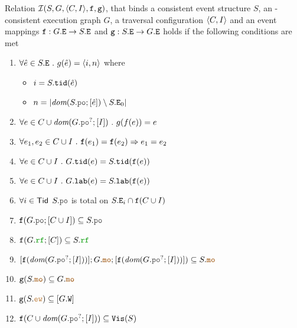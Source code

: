 \documentclass[12pt]{article}
\begin{document}
\begin{definition}
  Relation $\mathcal{I}(S, G, \langle C, I \rangle, {\mathtt{f}}, {\mathtt{g}})$, that binds a 
  consistent event structure $S$, an \imm-consistent execution graph $G$,
  a traversal configuration $\langle C, I \rangle$
  and an event mappings ${\mathtt{f}} : G.{\mathtt{E}} \rightarrow S.{\mathtt{E}}$ and ${\mathtt{g}} : S.{\mathtt{E}} \rightarrow G.{\mathtt{E}}$
  holds if the following conditions are met
  \begin{enumerate}[label={$\boldsymbol{\simR_{\arabic*}}$.},align=left]

    \item \label{item:sim-g-def}
    $\forall{\hat{e} \in S.{\mathtt{E}}} ~.~ g(\hat{e}) = \langle i, n \rangle$
    where 
    \begin{itemize}
      \item $i = S.{\mathtt{tid}}(\hat{e})$
      \item $n = |\dom{S.\lPO;[\hat{e}]} \setminus S.\lEo|$
    \end{itemize}
    
    \item \label{item:sim-fg-id}
    $\forall{e \in C \cup \dom{G.\lPO^?;[I]}} ~.~ g(f(e)) = e$

    \item \label{item:sim-finj}
    $\forall{e_1, e_2 \in C \cup I} ~.~ {\mathtt{f}}(e_1) = {\mathtt{f}}(e_2) \Rightarrow e_1 = e_2$

    \item \label{item:sim-ftid}
    $\forall{e \in C \cup I} ~.~ G.{\mathtt{tid}}(e) = S.{\mathtt{tid}}({\mathtt{f}}(e))$

    \item \label{item:sim-flab}
    $\forall{e \in C \cup I} ~.~ G.{\mathtt{lab}}(e) = S.{\mathtt{lab}}({\mathtt{f}}(e))$

    \item \label{item:sim-po-tot}
    $\forall{i \in \mathsf{Tid}}$
    $S.\lPO$ is total on $S.{\mathtt{E}}_{i} \cap {\mathtt{f}}(C \cup I)$

    \item \label{item:sim-po-in}
    $\f(G.\lPO;[C \cup I]) \subseteq S.\lPO$
    
    \item \label{item:sim-rf-in}
    $\f(G.\lRF;[C]) \subseteq S.\lRF$

    \item \label{item:sim-mo-in}
    $[\f(\dom{G.\lPO^?;[I]})];G.\lMO;[\f(\dom{G.\lPO^?;[I]})]) \subseteq S.\lMO$

    \item \label{item:sim-mo-pre}
    $\g(S.\lMO) \subseteq G.\lMO$

    \item \label{item:sim-ew-id}
    $\g(S.\lEW) \subseteq [G.\lW]$

    \item \label{item:sim-vis}
    $\f(C \cup \dom{G.\lPO^?;[I]}) \subseteq \lVIS(S)$
    
  \end{enumerate}
\end{definition}
\end{document}
